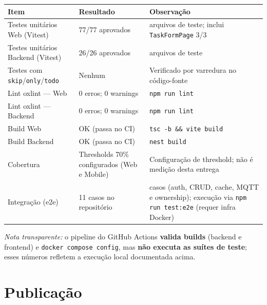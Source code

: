 \documentclass[11pt,a4paper]{article}
\begin{document}
\begin{tabularx}{\linewidth}{@{}l l >{\raggedright\arraybackslash}X@{}}
  \toprule
  \textbf{Item} & \textbf{Resultado} & \textbf{Observação} \\
  \midrule
  Testes unitários Web (Vitest) & 77/77 aprovados
    & 12 arquivos de teste; inclui \texttt{TaskFormPage} 3/3 \\
  Testes unitários Backend (Vitest) & 26/26 aprovados
    & 6 arquivos de teste \\
  Testes com \texttt{skip}/\texttt{only}/\texttt{todo} & Nenhum
    & Verificado por varredura no código-fonte \\
  Lint oxlint --- Web & 0 erros; 0 warnings
    & \texttt{npm run lint} \\
  Lint oxlint --- Backend & 0 erros; 0 warnings
    & \texttt{npm run lint} \\
  Build Web & OK (passa no CI)
    & \texttt{tsc -b \&\& vite build} \\
  Build Backend & OK (passa no CI)
    & \texttt{nest build} \\
  Cobertura & Thresholds 70\% configurados (Web e Mobile)
    & Configuração de threshold; não é medição desta entrega \\
  Integração (e2e) & 11 casos no repositório
    & 11 casos (auth, CRUD, cache, MQTT e ownership);
      execução via \texttt{npm run test:e2e} (requer infra Docker) \\
  \bottomrule
\end{tabularx}

\medskip
\emph{Nota transparente:} o pipeline do GitHub Actions \textbf{valida builds} (backend e
frontend) e \texttt{docker compose config}, mas \textbf{não executa as suítes de teste};
esses números refletem a execução local documentada acima.

\section{Publicação}
\end{document}
